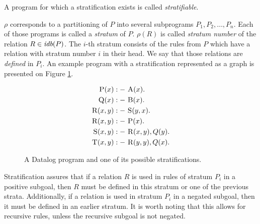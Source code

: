 A program for which a stratification exists is called \emph{stratifiable}. 


$\rho$ corresponds to a partitioning of $P$ into several subprograms $P_1, P_2, \dots, P_n$. Each of those programs is called a \emph{stratum} of $P$. $\rho(R)$ is called \emph{stratum number} of the relation $R \in \textit{idb}(P )$. The $i$-th stratum consists of the rules from $P$ which have a relation with stratum number $i$ in their head. We say that those relations are \emph{defined} in $P_i$. An example program with a stratification represented as a graph is presented on Figure \ref{fig:precedgraph}.

\begin{figure}[!htbp]
\begin{minipage}{0.5\linewidth}
\begin{align*}
\textsc{P}(x) &:-~ \textsc{A}(x).\\
\textsc{Q}(x) &:-~ \textsc{B}(x).\\
\textsc{R}(x, y) &:-~ \textsc{S}(y, x).\\
\textsc{R}(x, y) &:-~ \textsc{P}(x).\\
\textsc{S}(x, y) &:-~ \textsc{R}(x, y), Q(y).\\
\textsc{T}(x, y) &:-~ \textsc{R}(y, y), Q(x).\\
\end{align*}
\end{minipage}%
\begin{minipage}{0.5\linewidth}

\end{minipage}%
\caption{A Datalog program and one of its possible stratifications.}\label{fig:precedgraph}
\end{figure}

Stratification assures that if a relation $R$ is used in rules of stratum $P_i$ in a positive subgoal, then $R$ must be defined in this stratum or one of the previous strata. Additionally, if a relation is used in stratum $P_i$ in a negated subgoal, then it must be defined in an earlier stratum. It is worth noting that this allows for recursive rules, unless the recursive subgoal is not negated.

